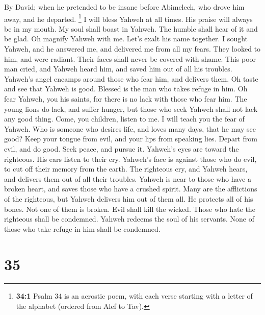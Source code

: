 By David; when he pretended to be insane before Abimelech, who drove him
away, and he departed.  \footnote{\textbf{34:1} Psalm 34
  is an acrostic poem, with each verse starting with a letter of the
  alphabet (ordered from Alef to Tav).} I will bless Yahweh at all
times. His praise will always be in my mouth.  My soul
shall boast in Yahweh. The humble shall hear of it and be glad.
 Oh magnify Yahweh with me. Let's exalt his name together.
 I sought Yahweh, and he answered me, and delivered me
from all my fears.  They looked to him, and were radiant.
Their faces shall never be covered with shame.  This poor
man cried, and Yahweh heard him, and saved him out of all his troubles.
 Yahweh's angel encamps around those who fear him, and
delivers them.  Oh taste and see that Yahweh is good.
Blessed is the man who takes refuge in him.  Oh fear
Yahweh, you his saints, for there is no lack with those who fear him.
 The young lions do lack, and suffer hunger, but those
who seek Yahweh shall not lack any good thing.  Come, you
children, listen to me. I will teach you the fear of Yahweh.
 Who is someone who desires life, and loves many days,
that he may see good?  Keep your tongue from evil, and
your lips from speaking lies.  Depart from evil, and do
good. Seek peace, and pursue it.  Yahweh's eyes are
toward the righteous. His ears listen to their cry. 
Yahweh's face is against those who do evil, to cut off their memory from
the earth.  The righteous cry, and Yahweh hears, and
delivers them out of all their troubles.  Yahweh is near
to those who have a broken heart, and saves those who have a crushed
spirit.  Many are the afflictions of the righteous, but
Yahweh delivers him out of them all.  He protects all of
his bones. Not one of them is broken.  Evil shall kill
the wicked. Those who hate the righteous shall be condemned.
 Yahweh redeems the soul of his servants. None of those
who take refuge in him shall be condemned.

\hypertarget{section-34}{%
\section{35}\label{section-34}}

